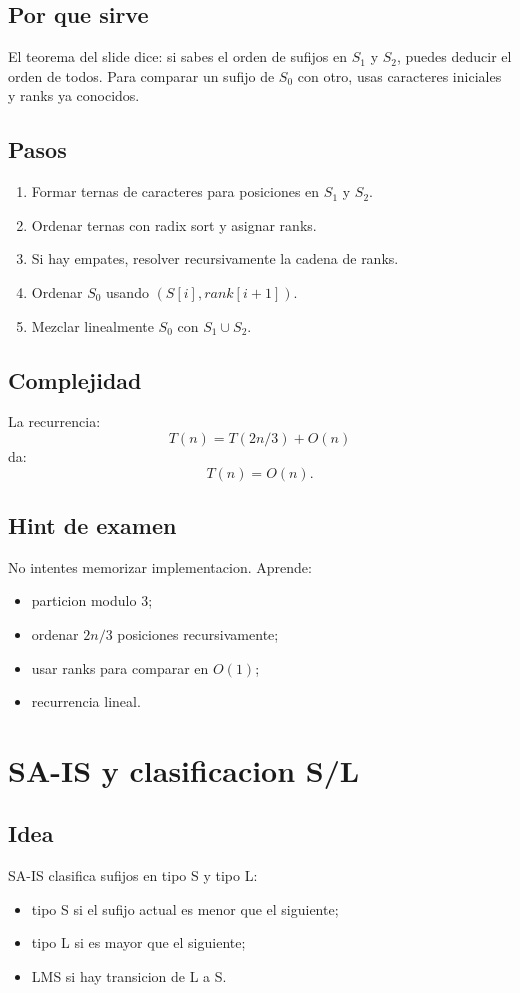 \documentclass[10pt]{article}
\newcommand{\bigO}{O}
\begin{document}
\subsection{Por que sirve}
El teorema del slide dice: si sabes el orden de sufijos en $S_1$ y $S_2$,
puedes deducir el orden de todos. Para comparar un sufijo de $S_0$ con otro,
usas caracteres iniciales y ranks ya conocidos.

\subsection{Pasos}
\begin{enumerate}[leftmargin=*]
\item Formar ternas de caracteres para posiciones en $S_1$ y $S_2$.
\item Ordenar ternas con radix sort y asignar ranks.
\item Si hay empates, resolver recursivamente la cadena de ranks.
\item Ordenar $S_0$ usando $(S[i],rank[i+1])$.
\item Mezclar linealmente $S_0$ con $S_1\cup S_2$.
\end{enumerate}

\subsection{Complejidad}
La recurrencia:
\[
T(n)=T(2n/3)+\bigO(n)
\]
da:
\[
T(n)=\bigO(n).
\]

\subsection{Hint de examen}
No intentes memorizar implementacion. Aprende:
\begin{itemize}[leftmargin=*]
\item particion modulo 3;
\item ordenar $2n/3$ posiciones recursivamente;
\item usar ranks para comparar en $\bigO(1)$;
\item recurrencia lineal.
\end{itemize}

\newpage
\section{SA-IS y clasificacion S/L}

\subsection{Idea}
SA-IS clasifica sufijos en tipo S y tipo L:
\begin{itemize}[leftmargin=*]
\item tipo S si el sufijo actual es menor que el siguiente;
\item tipo L si es mayor que el siguiente;
\item LMS si hay transicion de L a S.
\end{itemize}
\end{document}

